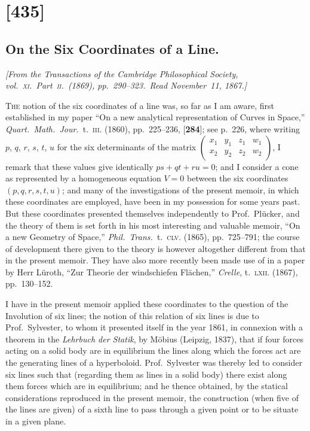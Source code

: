 \documentclass[11pt,a4paper]{article}
\begin{document}
\section{[435]}
\subsection{On the Six Coordinates of a Line.}

\begin{center}
\textit{[From the \textit{Transactions of the Cambridge Philosophical Society},
vol.~\textsc{xi}.\ Part~\textsc{ii}.\ (1869), pp.~290--323.\
Read November~11, 1867.]}
\end{center}

\medskip
\textsc{The} notion of the six coordinates of a line was, so far as I am
aware, first established in my paper ``On a new analytical representation of
Curves in Space,'' \textit{Quart.\ Math.\ Jour.\ }t.~\textsc{iii}. (1860),
pp.~225--236, [\textbf{284}]; see p.~226, where writing $p$, $q$, $r$, $s$,
$t$, $u$ for the six determinants of the matrix
$\left(\begin{smallmatrix} x_{1} & y_{1} & z_{1} & w_{1} \\
x_{2} & y_{2} & z_{2} & w_{2}\end{smallmatrix}\right)$,
I remark that these values give identically $ps + qt + ru = 0$; and I consider
a cone as represented by a homogeneous equation $V = 0$ between the six
coordinates $(p, q, r, s, t, u)$; and many of the investigations of the
present memoir, in which these coordinates are employed, have been in my
possession for some years past. But these coordinates presented themselves
independently to Prof.\ Pl\"ucker, and the theory of them is set forth in his
most interesting and valuable memoir, ``On a new Geometry of Space,''
\textit{Phil.\ Trans.\ }t.~\textsc{clv}. (1865), pp.~725--791; the course of
development there given to the theory is however altogether different from
that in the present memoir. They have also more recently been made use of in a
paper by Herr L\"uroth, ``Zur Theorie der windschiefen Fl\"achen,''
\textit{Crelle}, t.~\textsc{lxii}. (1867), pp.~130--152.

I have in the present memoir applied these coordinates to the question of the
Involution of six lines; the notion of this relation of six lines is due to
Prof.\ Sylvester, to whom it presented itself in the year 1861, in connexion
with a theorem in the \textit{Lehrbuch der Statik}, by M\"obius (Leipzig,
1837), that if four forces acting on a solid body are in equilibrium the lines
along which the forces act are the generating lines of a hyperboloid. Prof.\
Sylvester was thereby led to consider six lines such that (regarding them as
lines in a solid body) there exist along them forces which are in equilibrium;
and he thence obtained, by the statical considerations reproduced in the
present memoir, the construction (when five of the lines are given) of a
sixth line to pass through a given point or to be situate in a given plane.
\end{document}

